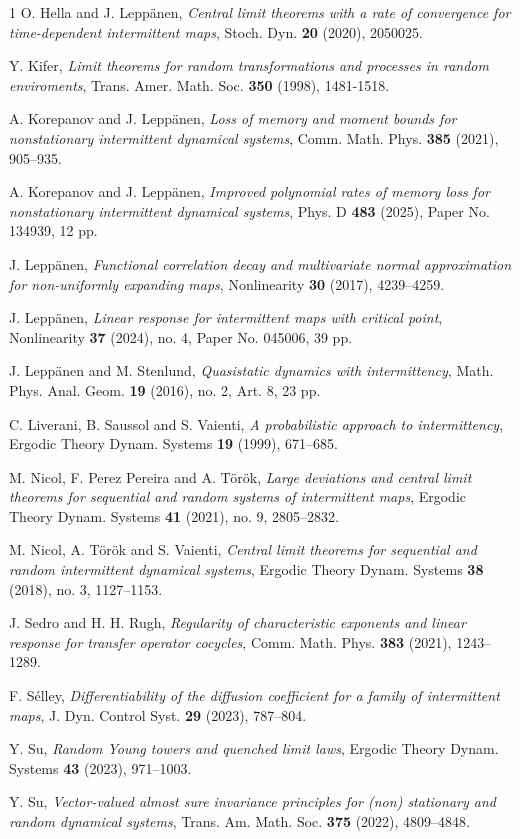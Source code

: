 \documentclass[12pt,reqno,a4paper]{article}
\begin{document}
\begin{thebibliography}{1}
	O. Hella and J. Lepp{\"a}nen, \emph{Central limit theorems with a rate of convergence for time-dependent intermittent maps}, Stoch. Dyn. \textbf{20} (2020), 2050025.
	
	Y. Kifer, \emph{Limit theorems for random transformations and processes in random enviroments}, Trans. Amer. Math. Soc. \textbf{350} (1998), 1481-1518.
	
	A. Korepanov and J. Lepp{\"a}nen, \emph{Loss of memory and moment bounds for nonstationary intermittent dynamical systems}, Comm. Math. Phys. \textbf{385} (2021), 905--935.
	
	A. Korepanov and J. Lepp{\"a}nen, \emph{Improved polynomial rates of memory loss for nonstationary intermittent dynamical systems}, Phys. D \textbf{483} (2025), Paper No. 134939, 12 pp.
	
	
	
	 J. Lepp\"{a}nen, \emph{Functional correlation decay and multivariate normal approximation for non-uniformly expanding maps}, Nonlinearity \textbf{30} (2017), 4239--4259.
	
	J. Lepp{\"a}nen, \emph{Linear response for intermittent maps with critical point},
	Nonlinearity \textbf{37} (2024), no. 4, Paper No. 045006, 39 pp.
	
	J. Lepp{\"a}nen and M. Stenlund, \emph{Quasistatic dynamics with intermittency}, 
	Math. Phys. Anal. Geom. \textbf{19} (2016), no. 2, Art. 8, 23 pp.
	
	C. Liverani, B. Saussol and S. Vaienti, \emph{A probabilistic approach to intermittency}, Ergodic Theory Dynam. Systems \textbf{19} (1999),  671--685.
	
	
	
	M. Nicol, F. Perez Pereira and A. T\"or\"ok, \emph{Large deviations and central limit theorems for sequential and
		random systems of intermittent maps}, 
	Ergodic Theory Dynam. Systems \textbf{41} (2021), no. 9, 2805--2832.
	
	M. Nicol, A. T\"or\"ok and S. Vaienti, \emph{Central limit theorems for sequential and random intermittent
		dynamical systems}, 
	Ergodic Theory Dynam. Systems \textbf{38} (2018), no. 3, 1127--1153.
	
	J. Sedro and H. H. Rugh, \emph{Regularity of characteristic exponents and linear response for transfer operator cocycles}, Comm. Math. Phys. \textbf{383} (2021), 1243--1289.
	
	F. S\'elley, \emph{Differentiability of the diffusion coefficient for a family of intermittent maps}, J. Dyn. Control Syst. \textbf{29} (2023),  787--804.
	
	Y. Su, \emph{Random Young towers and quenched
		limit laws}, Ergodic Theory Dynam. Systems \textbf{43} (2023), 971--1003.
	
	Y. Su, \emph{Vector-valued almost sure invariance principles for (non) stationary and random dynamical systems}, Trans. Am. Math. Soc.
	\textbf{375} (2022), 4809--4848.
\end{thebibliography}
\end{document}
